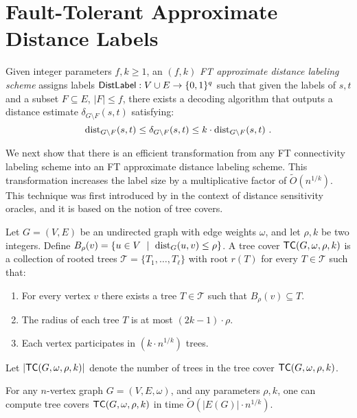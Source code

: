 \section{Fault-Tolerant Approximate Distance Labels}\label{sec:ft-distance}
Given integer parameters $f,k \geq 1$, an $(f,k)$ \emph{FT approximate distance labeling scheme} assigns labels $\mathsf{DistLabel}: V \cup E \to \{0,1\}^{q}$ such that given the labels of $s,t$ and a subset $F \subseteq E$, $|F|\leq f$, there exists a decoding algorithm that outputs a distance estimate $\delta_{G \setminus F}(s,t)$ satisfying:
$$\mbox{\rm dist}_{G\setminus F}(s,t) \leq \delta_{G \setminus F}(s,t) \leq k\cdot\mbox{\rm dist}_{G\setminus F}(s,t)~.$$

We next show that there is an efficient transformation from any FT connectivity labeling scheme into an FT approximate distance labeling scheme. This transformation increases the label size by a multiplicative factor of $\widetilde{O}(n^{1/k})$. This technique was first introduced by \cite{chechik2012f} in the context of distance sensitivity oracles, and it is based on the notion of tree covers.

\begin{definition}\label{def:tree-cover}
Let $G=(V,E)$ be an undirected graph with edge weights $\omega$, and let $\rho,k$ be two integers. Define $B_{\rho}(v)=\{ u \in V ~\mid~ \mbox{\rm dist}_G(u,v)\leq \rho\}$. A tree cover $\mathsf{TC}(G, \omega, \rho,k)$ is a collection of rooted trees $\mathcal{T}=\{T_1,\ldots, T_\ell\}$ with root $r(T)$ for every $T \in \mathcal{T}$ such that:
\begin{enumerate}[noitemsep]
\item For every vertex $v$ there exists a tree $T \in \mathcal{T}$ such that $B_{\rho}(v) \subseteq T$.
\item The radius of each tree $T$ is at most $(2k-1)\cdot \rho$.
\item Each vertex participates in $(k \cdot n^{1/k})$ trees.
\end{enumerate}
Let $|\mathsf{TC}(G, \omega, \rho,k)|$ denote the number of trees in the tree cover $\mathsf{TC}(G, \omega, \rho,k)$.
\end{definition}

\begin{proposition}\cite{Peleg:2000}
For any $n$-vertex graph $G=(V,E, \omega)$, and any parameters $\rho,k$, one can compute tree covers $\mathsf{TC}(G, \omega, \rho,k)$ in time $\widetilde{O}(|E(G)| \cdot n^{1/k})$.
\end{proposition}

